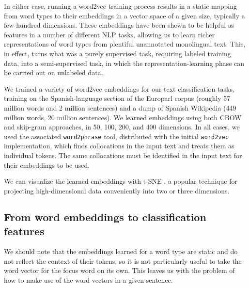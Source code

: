 In either case, running a word2vec training process results in a static mapping
from word types to their embeddings in a vector space of a given size,
typically a few hundred dimensions. These embeddings have been shown to be
helpful as features in a number of different NLP tasks, allowing us to learn
richer representations of word types from plentiful unannotated monolingual
text. This, in effect, turns what was a purely supervised task, requiring
labeled training data, into a semi-supervised task, in which the
representation-learning phase can be carried out on unlabeled data.



We trained a variety of word2vec embeddings for our text classification tasks,
training on the Spanish-language section of the Europarl corpus (roughly 57
million words and 2 million sentences) and a dump of Spanish Wikipedia (449
million words, 20 million sentences). We learned embeddings using both CBOW and
skip-gram approaches, in 50, 100, 200, and 400 dimensions. In all cases, we
used the associated \texttt{word2phrase} tool, distributed with the initial
\texttt{word2vec} implementation, which finds collocations in the input text
and treats them as individual tokens. The same collocations must be identified
in the input text for their embeddings to be used.

We can visualize the learned embeddings with t-SNE \cite{van2008visualizing},
a popular technique for projecting high-dimensional data conveniently into two
or three dimensions.

\subsection{From word embeddings to classification features}
We should note that the embeddings learned for a word type are static and do
not reflect the context of their tokens, so it is not particularly useful to
take the word vector for the focus word on its own. This leaves us with the
problem of how to make use of the word vectors in a given sentence.

